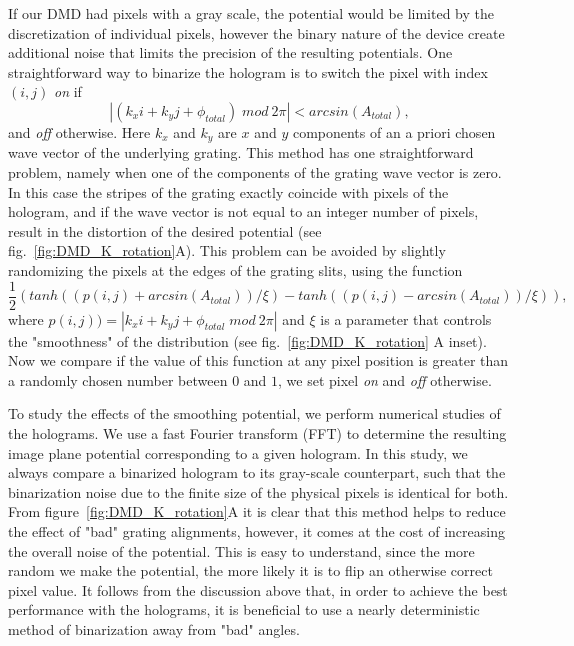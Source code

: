 If our DMD had pixels with a gray scale, the potential would be limited by the discretization of individual pixels, however the binary nature of the device create additional noise that limits the precision of the resulting potentials. One straightforward way to binarize the hologram is to switch the pixel with index $(i,j)$ \textit{on} if 
\begin{equation}
\left| (k_x i + k_y j + \phi_{total}) \; mod \: 2 \pi \right| < arcsin(A_{total}),
\end{equation}
and \textit{off} otherwise. Here $k_x$ and $k_y$ are $x$ and $y$ components of an a priori chosen wave vector of the underlying grating. This method has one straightforward problem, namely when one of the components of the grating wave vector is zero. In this case the stripes of the grating exactly coincide with pixels of the hologram, and if the wave vector is not equal to an integer number of pixels, result in the distortion of the desired potential (see fig.~\ref{fig:DMD_K_rotation}A). This problem can be avoided by slightly randomizing the pixels at the edges of the grating slits, using the function 
\begin{equation}
\frac{1}{2}(tanh((p(i,j) + arcsin(A_{total}))/\xi) - tanh((p(i,j) - arcsin(A_{total}))/\xi)),
\end{equation}
where $p(i,j))=\left| k_x i + k_y j + \phi_{total} \; mod \: 2 \pi \right|$ and $\xi$ is a parameter that controls the "smoothness" of the distribution (see fig.~\ref{fig:DMD_K_rotation} A inset). Now we compare if the value of this function at any pixel position is greater than a randomly chosen number between $0$ and $1$, we set pixel \textit{on} and \textit{off} otherwise. 

To study the effects of the smoothing potential, we perform numerical studies of the holograms. We use a fast Fourier transform (FFT) to determine the resulting image plane potential corresponding to a given hologram. In this study, we always compare a binarized hologram to its gray-scale counterpart, such that the binarization noise due to the finite size of the physical pixels is identical for both. From figure~\ref{fig:DMD_K_rotation}A it is clear that this method helps to reduce the effect of "bad" grating alignments, however, it comes at the cost of increasing the overall noise of the potential. This is easy to understand, since the more random we make the potential, the more likely it is to flip an otherwise correct pixel value. It follows from the discussion above that, in order to achieve the best performance with the holograms, it is beneficial to use a nearly deterministic method of binarization away from "bad" angles. 

